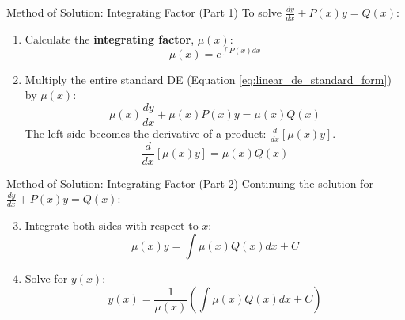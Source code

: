\documentclass[10pt,aspectratio=169]{beamer}
\begin{document}
\begin{frame}{Method of Solution: Integrating Factor (Part 1)}
    To solve $\frac{dy}{dx} + P(x)y = Q(x)$:
    \begin{enumerate}
        \item Calculate the \textbf{integrating factor}, $\mu(x)$:
        \begin{equation}
            \mu(x) = e^{\int P(x)dx}
            \label{eq:integrating_factor}
        \end{equation}
        \item Multiply the entire standard DE (Equation \ref{eq:linear_de_standard_form}) by $\mu(x)$:
        \begin{equation}
            \mu(x)\frac{dy}{dx} + \mu(x)P(x)y = \mu(x)Q(x)
        \end{equation}
        The left side becomes the derivative of a product: $\frac{d}{dx}[\mu(x)y]$.
        \begin{equation}
            \frac{d}{dx}[\mu(x)y] = \mu(x)Q(x)
        \end{equation}
    \end{enumerate}
\end{frame}

\begin{frame}{Method of Solution: Integrating Factor (Part 2)}
    Continuing the solution for $\frac{dy}{dx} + P(x)y = Q(x)$:
    \begin{enumerate}
        \setcounter{enumi}{2} %
        \item Integrate both sides with respect to $x$:
        \begin{equation}
            \mu(x)y = \int \mu(x)Q(x)dx + C
        \end{equation}
        \item Solve for $y(x)$:
        \begin{equation}
            y(x) = \frac{1}{\mu(x)} \left( \int \mu(x)Q(x)dx + C \right)
            \label{eq:linear_de_solution}
        \end{equation}
    \end{enumerate}
\end{frame}
\end{document}
